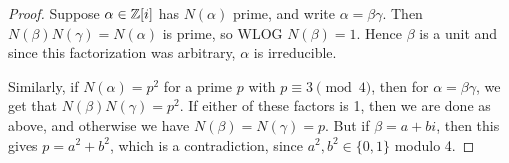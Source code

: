 \begin{proof}
    Suppose $\alpha \in \mathbb{Z}[i]$ has $N(\alpha)$ prime, and write $\alpha = \beta\gamma$. Then $N(\beta)N(\gamma) = N(\alpha)$ is prime, so WLOG $N(\beta) = 1$. Hence $\beta$ is a unit and since this factorization was arbitrary, $\alpha$ is irreducible.

    Similarly, if $N(\alpha) = p^2$ for a prime $p$ with $p \equiv 3 \pmod{4}$, then for $\alpha = \beta\gamma$, we get that $N(\beta)N(\gamma) = p^2$. If either of these factors is 1, then we are done as above, and otherwise we have $N(\beta) = N(\gamma) = p$. But if $\beta = a+bi$, then this gives $p = a^2+b^2$, which is a contradiction, since $a^2,b^2 \in \{0,1\}$ modulo 4.
\end{proof}